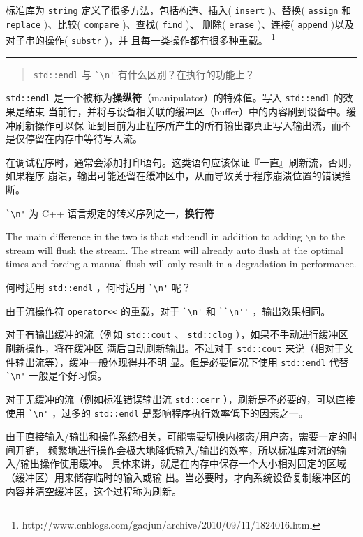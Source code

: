 标准库为 \verb|string| 定义了很多方法，包括构造、插入( \verb|insert| )、替换(
\verb|assign| 和 \verb|replace| )、比较( \verb|compare| )、查找( \verb|find| )、
删除( \verb|erase| )、连接( \verb|append| )以及对子串的操作( \verb|substr| )，并
且每一类操作都有很多种重载。%
\footnote{http://www.cnblogs.com/gaojun/archive/2010/09/11/1824016.html}%

\noindent\rule[0.25\baselineskip]{\textwidth}{1pt}

\begin{quotation}
  {\color{red}\verb|std::endl| 与 \verb|`\n'| 有什么区别？在执行的功能上？}
\end{quotation}

\verb|std::endl| 是一个被称为\textbf{操纵符}（manipulator）的特殊值。写入 \verb|std::endl| 的效果是结束
当前行，并将与设备相关联的缓冲区（buffer）中的内容刷到设备中。缓冲刷新操作可以保
证到目前为止程序所产生的所有输出都真正写入输出流，而不是仅停留在内存中等待写入流。

在调试程序时，通常会添加打印语句。这类语句应该保证『一直』刷新流，否则，如果程序
崩溃，输出可能还留在缓冲区中，从而导致关于程序崩溃位置的错误推断。

\verb|`\n'| 为 C++ 语言规定的转义序列之一，\textbf{换行符}

\begin{newnote}
  The main difference in the two is that std::endl in addition to adding $\backslash$n to
  the stream will flush the stream. The stream will already auto flush at the
  optimal times and forcing a manual flush will only result in a degradation in
  performance.
\end{newnote}

\noindent 何时适用 \verb|std::endl| ，何时适用 \verb|`\n'| 呢？

由于流操作符 \verb|operator<<| 的重载，对于 \verb|`\n'| 和 \verb|``\n''| ，输出效果相同。

对于有输出缓冲的流（例如 \verb|std::cout| 、 \verb|std::clog| ），如果不手动进行缓冲区刷新操作，将在缓冲区
满后自动刷新输出。不过对于 \verb|std::cout| 来说（相对于文件输出流等），缓冲一般体现得并不明
显。但是必要情况下使用 \verb|std::endl| 代替 \verb|`\n'| 一般是个好习惯。

对于无缓冲的流（例如标准错误输出流 \verb|std::cerr| ），刷新是不必要的，可以直接
使用 \verb|`\n'| ，过多的 \verb|std::endl| 是影响程序执行效率低下的因素之一。

由于直接输入/输出和操作系统相关，可能需要切换内核态/用户态，需要一定的时间开销，
频繁地进行操作会极大地降低输入/输出的效率，所以标准库对流的输入/输出操作使用缓冲。
具体来讲，就是在内存中保存一个大小相对固定的区域（缓冲区）用来储存临时的输入或输
出。当必要时，才向系统设备复制缓冲区的内容并清空缓冲区，这个过程称为刷新。

